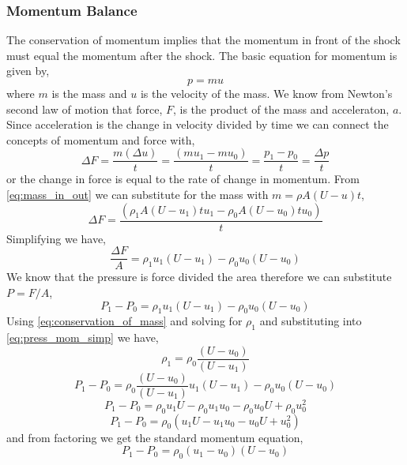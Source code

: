 \subsubsection{Momentum Balance}
The conservation of momentum implies that the momentum in front of the shock must equal the momentum after the shock.  The basic equation for momentum is given by,
\begin{equation} \label{eq:basic_mom}
p = mu
\end{equation}
where $m$ is the mass and $u$ is the velocity of the mass.  We know from Newton's second law of motion that force, $F$, is the product of the mass and acceleraton, $a$.  Since acceleration is the change in velocity divided by time we can connect the concepts of momentum and force with,
\begin{equation} \label{eq:force_momentum}
\Delta F = \frac{m(\Delta u)}{t} = \frac{(mu_1-mu_0)}{t} = \frac{p_1-p_0}{t} = \frac{\Delta p}{t}
\end{equation}
or the change in force is equal to the rate of change in momentum.  From \ref{eq:mass_in_out} we can substitute for the mass with $m=\rho A(U-u)t$,
\begin{equation} \label{eq:force_mom}
\Delta F = \frac{(\rho_1 A(U-u_1)tu_1 - \rho_0 A(U-u_0)tu_0)}{t}
\end{equation}
Simplifying we have,
\begin{equation} \label{eq:force_mom_simp}
\frac{\Delta F}{A} = \rho_1 u_1(U-u_1) - \rho_0 u_0(U-u_0)
\end{equation}
We know that the pressure is force divided the area therefore we can substitute $P = F/A$,
\begin{equation} \label{eq:press_mom_simp}
P_1-P_0 = \rho_1 u_1(U-u_1) - \rho_0 u_0(U-u_0)
\end{equation}
Using \ref{eq:conservation_of_mass} and solving for $\rho_1$ and substituting into \ref{eq:press_mom_simp} we have,
\begin{equation} \label{eq:cons_mass_rho_1}
\rho_1 = \rho_0\frac{(U-u_0)}{(U-u_1)}
\end{equation}
\begin{equation} \label{eq:sub_press_mom_simp}
P_1-P_0 = \rho_0\frac{(U-u_0)}{(U-u_1)} u_1(U-u_1) - \rho_0u_0(U-u_0)
\end{equation}
\begin{equation} \label{eq:sub_press_mom_expand}
P_1-P_0 = \rho_0u_1U-\rho_0u_1u_0 - \rho_0 u_0 U+\rho_0 u_0^2
\end{equation}
\begin{equation} \label{eq:sub_press_mom_expand2}
P_1-P_0 = \rho_0(u_1U - u_1u_0 - u_0 U + u_0^2)
\end{equation}
and from factoring we get the standard momentum equation,
\begin{equation} \label{eq:sub_press_mom_simp2}
P_1-P_0 = \rho_0(u_1 - u_0)(U - u_0)
\end{equation}

